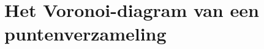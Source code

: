 \documentclass[tmi_notities.tex]{subfiles}
\begin{document}
\chapter{Het Voronoi-diagram van een puntenverzameling}
\end{document}
